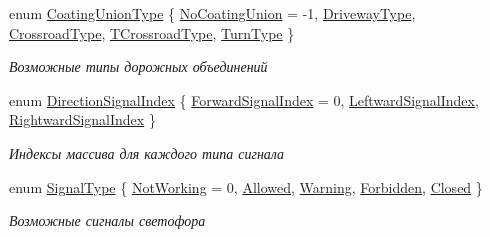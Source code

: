 \begin{DoxyCompactItemize}
\item 
enum \hyperlink{namespacertm_a6a0d424be5696f64038e5e84a79cabfa}{Coating\+Union\+Type} \{ \newline
\hyperlink{namespacertm_a6a0d424be5696f64038e5e84a79cabfaaeeceb6bb067031e5bab66a4986f0da85}{No\+Coating\+Union} = -\/1, 
\hyperlink{namespacertm_a6a0d424be5696f64038e5e84a79cabfaad3e63e8edfb44bd035c45f2cbac5e2ea}{Driveway\+Type}, 
\hyperlink{namespacertm_a6a0d424be5696f64038e5e84a79cabfaa99f4b4957261e8e0028087e1faf73e66}{Crossroad\+Type}, 
\hyperlink{namespacertm_a6a0d424be5696f64038e5e84a79cabfaaf6ed2ba75cfa7bd2651f31a64fd0e116}{T\+Crossroad\+Type}, 
\newline
\hyperlink{namespacertm_a6a0d424be5696f64038e5e84a79cabfaabe29616db907d70cdb28bf760a6558e4}{Turn\+Type}
 \}\begin{DoxyCompactList}\small\item\em Возможные типы дорожных объединений \end{DoxyCompactList}
\item 
enum \hyperlink{namespacertm_a27eb93235356cdffe25fe6628e7eff14}{Direction\+Signal\+Index} \{ \hyperlink{namespacertm_a27eb93235356cdffe25fe6628e7eff14afd494a11c605354fdc2fef743b7c2352}{Forward\+Signal\+Index} = 0, 
\hyperlink{namespacertm_a27eb93235356cdffe25fe6628e7eff14af0f9c75631e89e62c264c751a4fa903a}{Leftward\+Signal\+Index}, 
\hyperlink{namespacertm_a27eb93235356cdffe25fe6628e7eff14ae8899ee31b187a850f80275563429876}{Rightward\+Signal\+Index}
 \}\begin{DoxyCompactList}\small\item\em Индексы массива для каждого типа сигнала \end{DoxyCompactList}
\item 
enum \hyperlink{namespacertm_aadb7300c15d57429546fb0b7f8ee0ee6}{Signal\+Type} \{ \newline
\hyperlink{namespacertm_aadb7300c15d57429546fb0b7f8ee0ee6ad63ea1c40cb745fd50a2efad23ccbd1f}{Not\+Working} = 0, 
\hyperlink{namespacertm_aadb7300c15d57429546fb0b7f8ee0ee6abdebd193c23b52b2c94bd861a5cc9605}{Allowed}, 
\hyperlink{namespacertm_aadb7300c15d57429546fb0b7f8ee0ee6a40122a9b70f06e7103f3136579e15bc1}{Warning}, 
\hyperlink{namespacertm_aadb7300c15d57429546fb0b7f8ee0ee6a4dd5b3645f4a834fdd79e4c22cbc31ae}{Forbidden}, 
\newline
\hyperlink{namespacertm_aadb7300c15d57429546fb0b7f8ee0ee6a861510405768a65d00e9956410b8947b}{Closed}
 \}\begin{DoxyCompactList}\small\item\em Возможные сигналы светофора \end{DoxyCompactList}

\end{DoxyCompactItemize}
